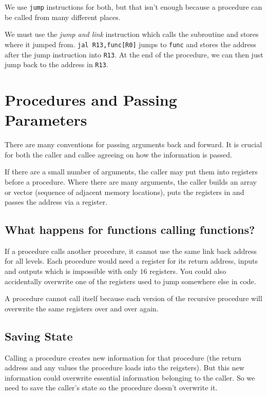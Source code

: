 We use \texttt{jump} instructions for both, but that isn't enough because a procedure can be called from many different places.

We must use the \emph{jump and link} instruction which calls the subroutine and stores where it jumped from.
\texttt{jal R13,func[R0]} jumps to \texttt{func} and stores the address after the jump instruction into \texttt{R13}.
At the end of the procedure, we can then just jump back to the address in \texttt{R13}.

\section{Procedures and Passing Parameters}\label{sec:procedures_and_passing_parameters}

There are many conventions for passing arguments back and forward.
It is crucial for both the caller and callee agreeing on how the information is passed.

If there are a small number of arguments, the caller may put them into registers before a procedure.
Where there are many arguments, the caller builds an array or vector (sequence of adjacent memory locations), puts the registers in and passes the address via a register.

\subsection{What happens for functions calling functions?}\label{sub:what_happens_for_functions_calling_functions_}

If a procedure calls another procedure, it cannot use the same link back address for all levels.
Each procedure would need a register for its return address, inputs and outputs which is impossible with only \(16\) registers.
You could also accidentally overwrite one of the registers used to jump somewhere else in code.

A procedure cannot call itself because each version of the recursive procedure will overwrite the same registers over and over again.

\subsection{Saving State}\label{sub:saving_state}

Calling a procedure creates new information for that procedure (the return address and any values the procedure loads into the reigsters).
But this new information could overwrite essential information belonging to the caller.
So we need to save the caller's state so the procedure doesn't overwrite it.

